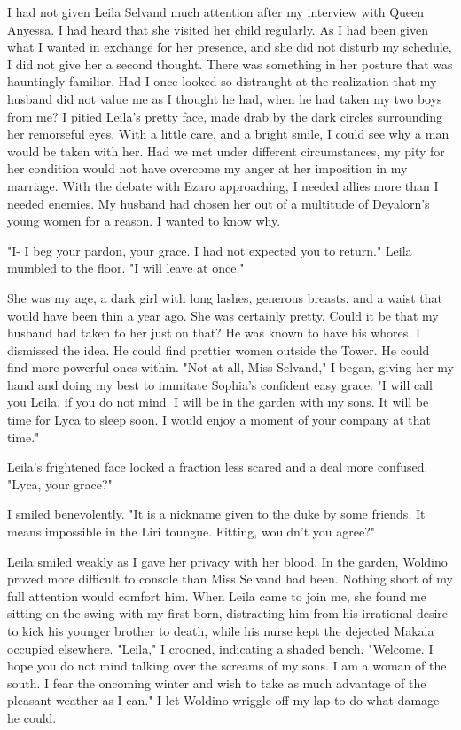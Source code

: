 \documentclass{article}
\begin{document}
I had not given Leila Selvand much attention after my interview with Queen Anyessa. I had heard that she visited her child regularly. As I had been given what I wanted in exchange for her presence, and she did not disturb my schedule, I did not give her a second thought. There was something in her posture that was hauntingly familiar. Had I once looked so distraught at the realization that my husband did not value me as I thought he had, when he had taken my two boys from me? I pitied Leila's pretty face, made drab by the dark circles surrounding her remorseful eyes. With a little care, and a bright smile, I could see why a man would be taken with her. Had we met under different circumstances, my pity for her condition would not have overcome my anger at her imposition in my marriage. With the debate with Ezaro approaching, I needed allies more than I needed enemies. My husband had chosen her out of a multitude of Deyalorn's young women for a reason. I wanted to know why.

"I- I beg your pardon, your grace. I had not expected you to return." Leila mumbled to the floor. "I will leave at once."

She was my age, a dark girl with long lashes, generous breasts, and a waist that would have been thin a year ago. She was certainly pretty. Could it be that my husband had taken to her just on that? He was known to have his whores. I dismissed the idea. He could find prettier women outside the Tower. He could find more powerful ones within. "Not at all, Miss Selvand," I began, giving her my hand and doing my best to immitate Sophia's confident easy grace. "I will call you Leila, if you do not mind. I will be in the garden with my sons. It will be time for Lyca to sleep soon. I would enjoy a moment of your company at that time."

Leila's frightened face looked a fraction less scared and a deal more confused. "Lyca, your grace?"

I smiled benevolently. "It is a nickname given to the duke by some friends. It means impossible in the Liri toungue. Fitting, wouldn't you agree?"

Leila smiled weakly as I gave her privacy with her blood. In the garden, Woldino proved more difficult to console than Miss Selvand had been. Nothing short of my full attention would comfort him. When Leila came to join me, she found me sitting on the swing with my first born, distracting him from his irrational desire to kick his younger brother to death, while his nurse kept the dejected Makala occupied elsewhere. "Leila," I crooned, indicating a shaded bench. "Welcome. I hope you do not mind talking over the screams of my sons. I am a woman of the south. I fear the oncoming winter and wish to take as much advantage of the pleasant weather as I can." I let Woldino wriggle off my lap to do what damage he could.
\end{document}
